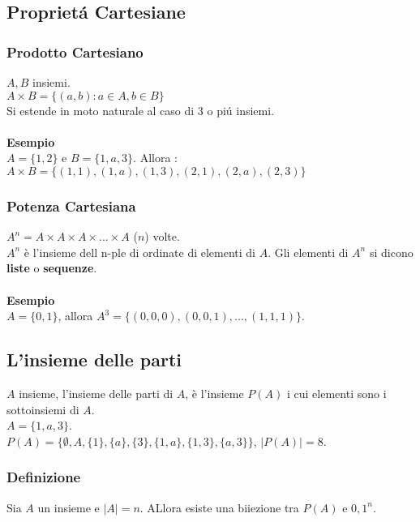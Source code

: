 \documentclass[11pt]{article}
\begin{document}
            \subsection{Propriet\'a Cartesiane}
            \subsubsection{Prodotto Cartesiano}
            $A,B$ insiemi.\\
            $A \times B = \{(a,b) : a \in A, b \in B\}$\\
            Si estende in moto naturale al caso di $3$ o pi\'u insiemi.\\
            \\
            \textbf{\large Esempio}\\
            $A = \{1,2\}$ e $B = \{1,a,3\}$. Allora :
            $A \times B = \{(1,1), (1,a), (1,3), (2,1),(2,a),(2,3)\}$\\
            \subsubsection{Potenza Cartesiana}
            $A^n = A \times A \times A \times ... \times A$ ($n$) volte.\\
            $A^n$ è l'insieme dell n-ple di ordinate di elementi di $A$.
            Gli elementi di $A^n$ si dicono \textbf{liste} o \textbf{sequenze}.\\
            \\
            \textbf{\large Esempio}\\
            $A = \{0,1\}$, allora $A^3 = \{(0,0,0), (0,0,1),...,(1,1,1) \}$.\\
            \subsection{L'insieme delle parti}
            $A$ insieme, l'insieme delle parti di $A$, è l'insieme $P(A)$ i cui elementi sono i sottoinsiemi di $A$.\\
            $A = \{1,a,3\}$.\\
            $P(A) = \{\emptyset, A, \{1\}, \{a\}, \{3\}, \{1,a\}, \{1,3\}, \{a,3\}\}$, $|P(A)| = 8$.\\
            \subsubsection{Definizione}
            Sia $A$ un insieme e $|A| = n$. ALlora esiste una biiezione tra $P(A)$ e ${0,1}^n$.
\end{document}
